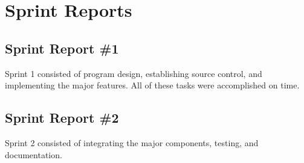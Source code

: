 
\chapter{Sprint Reports}

\section{Sprint Report \#1}

Sprint 1 consisted of program design, establishing source control, and implementing the major features. All of these tasks were accomplished on time. 

\section{Sprint Report \#2}

Sprint 2 consisted of integrating the major components, testing, and documentation.
